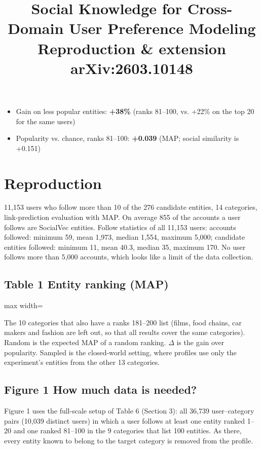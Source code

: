 \documentclass[10pt]{article}
\begin{document}
\title{Social Knowledge for Cross-Domain User Preference Modeling\\[4pt]\large Reproduction \& extension \textperiodcentered{} arXiv:2603.10148}
\date{}
\maketitle
\begin{itemize}
  \item Gain on less popular entities: \textbf{+38\%} (ranks 81--100, vs. +22\% on the top 20 for the same users)
  \item Popularity vs. chance, ranks 81--100: \textbf{+0.039} (MAP; social similarity is +0.151)
\end{itemize}
\section{Reproduction}
11,153 users who follow more than 10 of the 276 candidate entities, 14 categories, link-prediction evaluation with MAP. On average 855 of the accounts a user follows are SocialVec entities. Follow statistics of all 11,153 users: accounts followed: minimum 59, mean 1,973, median 1,554, maximum 5,000; candidate entities followed: minimum 11, mean 40.3, median 35, maximum 170. No user follows more than 5,000 accounts, which looks like a limit of the data collection.

\subsection*{Table 1 \textperiodcentered{} Entity ranking (MAP)}
\begin{center}\begin{adjustbox}{max width=\linewidth}

\end{adjustbox}\end{center}

{\small The 10 categories that also have a ranks 181--200 list (films, food chains, car makers and fashion are left out, so that all results cover the same categories). Random is the expected MAP of a random ranking. $\Delta$ is the gain over popularity. Sampled is the closed-world setting, where profiles use only the experiment's entities from the other 13 categories.}

\subsection*{Figure 1 \textperiodcentered{} How much data is needed?}
Figure 1 uses the full-scale setup of Table 6 (Section 3): all 36,739 user--category pairs (10,039 distinct users) in which a user follows at least one entity ranked 1--20 and one ranked 81--100 in the 9 categories that list 100 entities. As there, every entity known to belong to the target category is removed from the profile.
\end{document}
